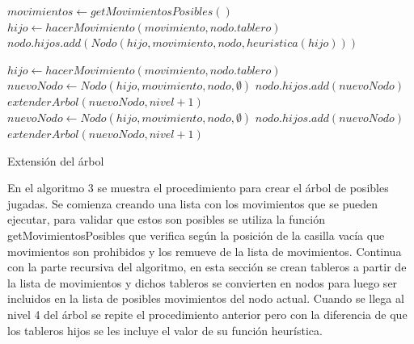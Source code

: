 \documentclass[a4paper]{article}
\theoremstyle{plain}
\theoremstyle{definition}
\begin{document}
        \begin{algorithm}[H]
        \begin{algorithmic}[1]
        
            \State $movimientos \leftarrow getMovimientosPosibles()$
                    \State$hijo \leftarrow hacerMovimiento(movimiento, nodo.tablero)$
                        \State $nodo.hijos.add( Nodo( hijo, movimiento, nodo, heuristica(hijo) ) )$
                    \EndIf
                \EndFor
                
            \Else
                    \State$hijo \leftarrow hacerMovimiento(movimiento, nodo.tablero)$
                            \State $nuevoNodo \leftarrow Nodo( hijo, movimiento, nodo, \emptyset )$
                            \State $nodo.hijos.add( nuevoNodo )$
                            \State $extenderArbol(nuevoNodo, nivel + 1)$
                        \EndIf
                    \Else
                        \State $nuevoNodo \leftarrow Nodo( hijo, movimiento, nodo, \emptyset )$
                        \State $nodo.hijos.add( nuevoNodo )$
                        \State $extenderArbol(nuevoNodo, nivel + 1)$
                    \EndIf
                \EndFor
            \EndIf
        \EndProcedure
        
        \end{algorithmic}
        
        \caption{Extensión del árbol}
        \end{algorithm}
	    En el algoritmo 3 se muestra el procedimiento para crear el árbol de posibles jugadas. Se comienza creando una lista con los movimientos que se pueden ejecutar, para validar que estos son posibles se utiliza la función getMovimientosPosibles que verifica según la posición de la casilla vacía que movimientos son prohibidos y los remueve de la lista de movimientos. Continua con la parte recursiva del algoritmo, en esta sección se crean tableros a partir de la lista de movimientos y dichos tableros se convierten en nodos para luego ser incluidos en la lista de posibles movimientos del nodo actual. Cuando se llega al nivel 4 del árbol se repite el procedimiento anterior pero con la diferencia de que los tableros hijos se les incluye el valor de su función heurística.
	    
\end{document}
